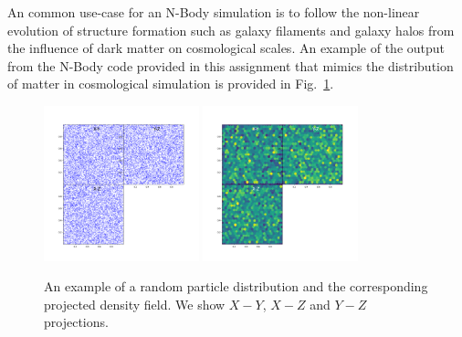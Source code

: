 \par 
An common use-case for an N-Body simulation is to follow the non-linear evolution of structure formation such as galaxy filaments and galaxy halos from the influence of dark matter on cosmological scales. An example of the output from the N-Body code provided in this assignment that mimics the distribution of matter in cosmological simulation is provided in Fig.~\ref{fig:nbody-distribution}.
\begin{figure}[!h]	
	\centering
	\includegraphics[width=0.4\textwidth, valign=c, clip=true, trim=2.cm 2.cm 2.cm 2.cm]{figs/nbody-scatter-plot.t-0.png}
	\includegraphics[width=0.4\textwidth, valign=c, clip=true, trim=2.cm 2.cm 2.cm 2.cm]{figs/nbody-density-plot.t-0.png}
	\caption{An example of a random particle distribution and the corresponding projected density field. We show $X-Y$, $X-Z$ and $Y-Z$ projections.}
	\label{fig:nbody-distribution}
\end{figure}


